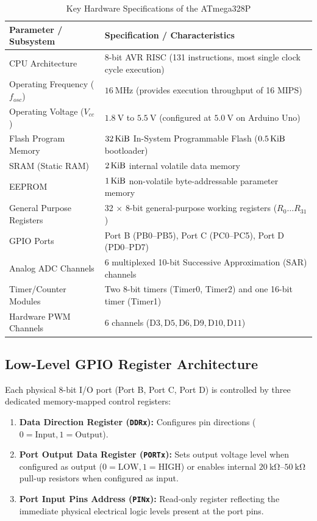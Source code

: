\begin{table}[htbp]
\centering
\caption{Key Hardware Specifications of the ATmega328P}
\label{tab:atmega328p-specs}
\begin{tabularx}{\textwidth}{l X}
\toprule
\textbf{Parameter / Subsystem} & \textbf{Specification / Characteristics} \\
\midrule
CPU Architecture & 8-bit AVR RISC (131 instructions, most single clock cycle execution) \\
Operating Frequency ($f_{osc}$) & $\SI{16}{\mega\hertz}$ (provides execution throughput of 16 MIPS) \\
Operating Voltage ($V_{cc}$) & $\SI{1.8}{\volt}$ to $\SI{5.5}{\volt}$ (configured at $\SI{5.0}{\volt}$ on Arduino Uno) \\
Flash Program Memory & $\SI{32}{\kibi\byte}$ In-System Programmable Flash ($\SI{0.5}{\kibi\byte}$ bootloader) \\
SRAM (Static RAM) & $\SI{2}{\kibi\byte}$ internal volatile data memory \\
EEPROM & $\SI{1}{\kibi\byte}$ non-volatile byte-addressable parameter memory \\
General Purpose Registers & 32 $\times$ 8-bit general-purpose working registers ($R_0 \dots R_{31}$) \\
GPIO Ports & Port B (PB0--PB5), Port C (PC0--PC5), Port D (PD0--PD7) \\
Analog ADC Channels & 6 multiplexed 10-bit Successive Approximation (SAR) channels \\
Timer/Counter Modules & Two 8-bit timers (Timer0, Timer2) and one 16-bit timer (Timer1) \\
Hardware PWM Channels & 6 channels ($\text{D3}, \text{D5}, \text{D6}, \text{D9}, \text{D10}, \text{D11}$) \\
\bottomrule
\end{tabularx}
\end{table}

\subsection{Low-Level GPIO Register Architecture}
Each physical 8-bit I/O port (Port B, Port C, Port D) is controlled by three dedicated memory-mapped control registers:
\begin{enumerate}
    \item \textbf{Data Direction Register (\texttt{DDRx}):} Configures pin directions ($0 = \text{Input}, 1 = \text{Output}$).
    \item \textbf{Port Output Data Register (\texttt{PORTx}):} Sets output voltage level when configured as output ($0 = \text{LOW}, 1 = \text{HIGH}$) or enables internal $\SI{20}{\kilo\ohm}\text{--}\SI{50}{\kilo\ohm}$ pull-up resistors when configured as input.
    \item \textbf{Port Input Pins Address (\texttt{PINx}):} Read-only register reflecting the immediate physical electrical logic levels present at the port pins.
\end{enumerate}

